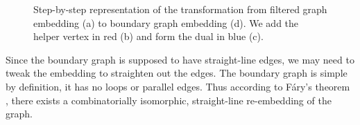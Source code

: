 \begin{figure}[H]
	\centering
	\caption{Step-by-step representation of the transformation from filtered graph embedding (a) to boundary graph embedding (d). We add the helper vertex in red (b) and form the dual in blue (c).}
	\label{fig:transformation}
\end{figure}

Since the boundary graph is supposed to have straight-line edges, we may need to tweak the embedding to straighten out the edges. The boundary graph is simple by definition, \ie{} it has no loops or parallel edges. Thus according to Fáry's theorem \cite{fary1948straight}, there exists a combinatorially isomorphic, straight-line re-embedding of the graph.

